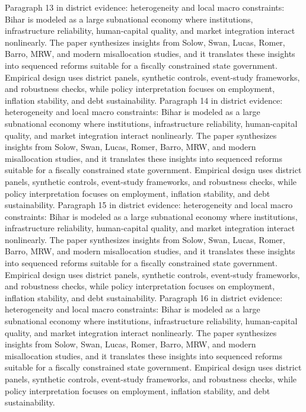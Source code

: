 \documentclass[preprint,12pt]{elsarticle}
\begin{document}
Paragraph 13 in district evidence: heterogeneity and local macro constraints: Bihar is modeled as a large subnational economy where institutions, infrastructure reliability, human-capital quality, and market integration interact nonlinearly. The paper synthesizes insights from Solow, Swan, Lucas, Romer, Barro, MRW, and modern misallocation studies, and it translates these insights into sequenced reforms suitable for a fiscally constrained state government. Empirical design uses district panels, synthetic controls, event-study frameworks, and robustness checks, while policy interpretation focuses on employment, inflation stability, and debt sustainability.
Paragraph 14 in district evidence: heterogeneity and local macro constraints: Bihar is modeled as a large subnational economy where institutions, infrastructure reliability, human-capital quality, and market integration interact nonlinearly. The paper synthesizes insights from Solow, Swan, Lucas, Romer, Barro, MRW, and modern misallocation studies, and it translates these insights into sequenced reforms suitable for a fiscally constrained state government. Empirical design uses district panels, synthetic controls, event-study frameworks, and robustness checks, while policy interpretation focuses on employment, inflation stability, and debt sustainability.
Paragraph 15 in district evidence: heterogeneity and local macro constraints: Bihar is modeled as a large subnational economy where institutions, infrastructure reliability, human-capital quality, and market integration interact nonlinearly. The paper synthesizes insights from Solow, Swan, Lucas, Romer, Barro, MRW, and modern misallocation studies, and it translates these insights into sequenced reforms suitable for a fiscally constrained state government. Empirical design uses district panels, synthetic controls, event-study frameworks, and robustness checks, while policy interpretation focuses on employment, inflation stability, and debt sustainability.
Paragraph 16 in district evidence: heterogeneity and local macro constraints: Bihar is modeled as a large subnational economy where institutions, infrastructure reliability, human-capital quality, and market integration interact nonlinearly. The paper synthesizes insights from Solow, Swan, Lucas, Romer, Barro, MRW, and modern misallocation studies, and it translates these insights into sequenced reforms suitable for a fiscally constrained state government. Empirical design uses district panels, synthetic controls, event-study frameworks, and robustness checks, while policy interpretation focuses on employment, inflation stability, and debt sustainability.
\end{document}
